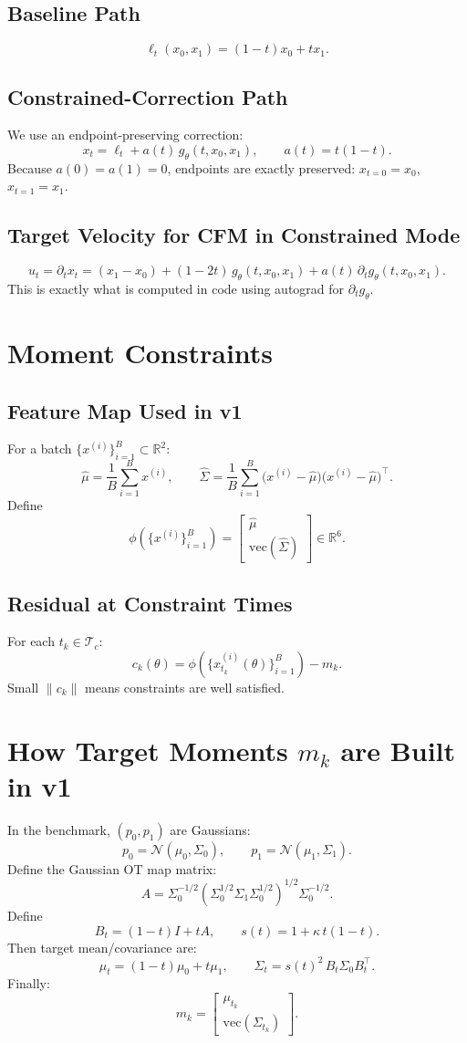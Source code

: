 \documentclass[11pt]{article}
\begin{document}
\subsection{Baseline Path}
\[
\ell_t(x_0,x_1) = (1-t)x_0 + tx_1.
\]

\subsection{Constrained-Correction Path}
We use an endpoint-preserving correction:
\[
x_t = \ell_t + a(t)\, g_\theta(t,x_0,x_1),
\qquad
a(t)=t(1-t).
\]
Because $a(0)=a(1)=0$, endpoints are exactly preserved: $x_{t=0}=x_0$, $x_{t=1}=x_1$.

\subsection{Target Velocity for CFM in Constrained Mode}
\[
u_t = \partial_t x_t
=
(x_1-x_0)
+ (1-2t)\,g_\theta(t,x_0,x_1)
+ a(t)\,\partial_t g_\theta(t,x_0,x_1).
\]
This is exactly what is computed in code using autograd for $\partial_t g_\theta$.

\section{Moment Constraints}
\subsection{Feature Map Used in v1}
For a batch $\{x^{(i)}\}_{i=1}^B \subset \mathbb{R}^2$:
\[
\hat{\mu} = \frac{1}{B}\sum_{i=1}^B x^{(i)},
\qquad
\hat{\Sigma} = \frac{1}{B}\sum_{i=1}^B
\big(x^{(i)}-\hat{\mu}\big)\big(x^{(i)}-\hat{\mu}\big)^\top.
\]
Define
\[
\phi(\{x^{(i)}\}_{i=1}^B)
=
\begin{bmatrix}
\hat{\mu} \\
\mathrm{vec}(\hat{\Sigma})
\end{bmatrix}
\in \mathbb{R}^{6}.
\]

\subsection{Residual at Constraint Times}
For each $t_k \in \mathcal{T}_c$:
\[
c_k(\theta) = \phi\!\left(\{x_{t_k}^{(i)}(\theta)\}_{i=1}^B\right) - m_k.
\]
Small $\|c_k\|$ means constraints are well satisfied.

\section{How Target Moments $m_k$ are Built in v1}
In the benchmark, $(p_0,p_1)$ are Gaussians:
\[
p_0=\mathcal{N}(\mu_0,\Sigma_0), \qquad p_1=\mathcal{N}(\mu_1,\Sigma_1).
\]
Define the Gaussian OT map matrix:
\[
A
=
\Sigma_0^{-1/2}
\left(
\Sigma_0^{1/2}\Sigma_1\Sigma_0^{1/2}
\right)^{1/2}
\Sigma_0^{-1/2}.
\]
Define
\[
B_t=(1-t)I+tA,
\qquad
s(t)=1+\kappa\,t(1-t).
\]
Then target mean/covariance are:
\[
\mu_t = (1-t)\mu_0 + t\mu_1,
\qquad
\Sigma_t = s(t)^2\, B_t \Sigma_0 B_t^\top.
\]
Finally:
\[
m_k
=
\begin{bmatrix}
\mu_{t_k}\\
\mathrm{vec}(\Sigma_{t_k})
\end{bmatrix}.
\]
\end{document}
